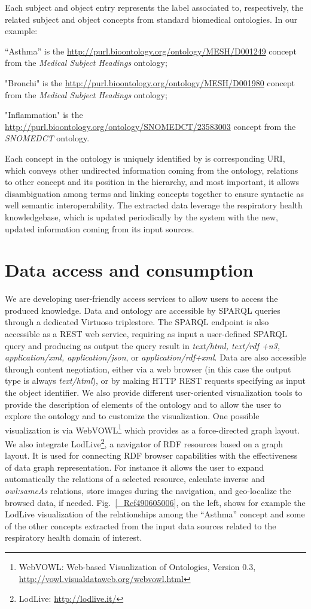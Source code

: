 \documentclass[runningheads,a4paper]{llncs}
\begin{document}
Each subject and object entry represents the label associated to, respectively, the related subject and object concepts from standard biomedical ontologies. In our example:

``Asthma'' is the \url{http://purl.bioontology.org/ontology/MESH/D001249} concept from the {\em Medical Subject Headings }ontology;

"Bronchi" is the \url{http://purl.bioontology.org/ontology/MESH/D001980} concept from the {\em Medical Subject Headings }ontology;

"Inflammation" is the \url{http://purl.bioontology.org/ontology/SNOMEDCT/23583003} concept from the {\em SNOMEDCT }ontology.

Each concept in the ontology is uniquely identified by is corresponding URI, which conveys other undirected information coming from the ontology, relations to other concept and its position in the hierarchy, and most important, it allows disambiguation among terms and linking concepts together to ensure syntactic as well semantic interoperability. The extracted data leverage the respiratory health knowledgebase, which is updated periodically by the system with the new, updated information coming from its input sources. 

\section{Data access and consumption}

We are developing user-friendly access services to allow users to access the produced knowledge. Data and ontology are accessible by SPARQL queries through a dedicated Virtuoso triplestore. The SPARQL endpoint is also accessible as a REST web service, requiring as input a user-defined SPARQL query and producing as output the query result in {\em text/html, text/rdf +n3, application/xml, application/json}, or {\em application/rdf+xml}. Data are also accessible through content negotiation, either via a web browser (in this case the output type is always {\em text/html}), or by making HTTP REST requests specifying as input the object identifier. We also provide different user-oriented visualization tools to provide the description of elements of the ontology and to allow the user to explore the ontology and to customize the visualization. One possible visualization is via WebVOWL\footnote{ WebVOWL: Web-based Visualization of Ontologies, Version 0.3, \url{http://vowl.visualdataweb.org/webvowl.html}} which provides as a force-directed graph layout. We also integrate LodLive\footnote{ LodLive: \url{http://lodlive.it/}}, a navigator of RDF resources based on a graph layout. It is used for connecting RDF browser capabilities with the effectiveness of data graph representation. For instance it allows the user to expand automatically the relations of a selected resource, calculate inverse and {\em owl:sameAs} relations, store images during the navigation, and geo-localize the browsed data, if needed. Fig.~\ref{_Ref490605006}, on the left, shows for example the LodLive visualization of the relationships among the ``Asthma'' concept and some of the other concepts extracted from the input data sources related to the respiratory health domain of interest. 
\end{document}
